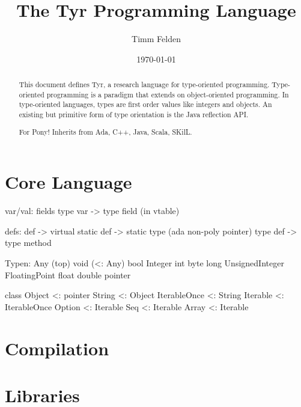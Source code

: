 \documentclass[a4paper,10pt]{article}
\title{The Tyr Programming Language}
\author{Timm Felden}
\date{\today}
\begin{document}
\maketitle

\begin{abstract}
This document defines Tyr, a research language for type-oriented programming.
Type-oriented programming is a paradigm that extends on object-oriented programming.
In type-oriented languages, types are first order values like integers and objects.
An existing but primitive form of type orientation is the Java reflection API.
\end{abstract}

\renewcommand{\abstractname}{Acknowledgements}
\begin{abstract}
For Pony!
Inherits from Ada, C++, Java, Scala, SKilL.
\end{abstract}

\tableofcontents

\newpage
\part{Core Language}
\label{part:spec}








var/val:
  fields
  type var -> type field (in vtable)

defs:
 def -> virtual
 static def -> static type (ada non-poly pointer)
 type def -> type method


Typen:
 Any (top)
 void (<: Any)
 bool
 Integer
 int
 byte
 long
 UnsignedInteger
 FloatingPoint
 float
 double
 pointer
 
class Object <: pointer
  String <: Object
  IterableOnce <: String
  Iterable <: IterableOnce
  Option <: Iterable
  Seq <: Iterable
  Array <: Iterable


\part{Compilation}






\part{Libraries}
\end{document}

